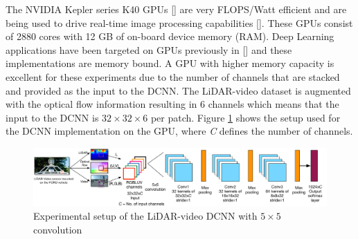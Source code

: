 \documentclass{article}
\begin{document}
The NVIDIA Kepler series K40 GPUs [\cite{NVIDIA-Inc.2012NVIDIAs-Ne}] are very FLOPS/Watt efficient and are being used to drive real-time image processing capabilities [\cite{Venugopal2013Accelerati}]. These GPUs consist of 2880 cores with 12 GB of on-board device memory (RAM). Deep Learning applications have been targeted on GPUs previously in [\cite{Krizhevsky2012Imagenet-C}] and these implementations are memory bound. A GPU with higher memory capacity is excellent for these experiments due to the number of channels that are stacked and provided as the input to the DCNN. The LiDAR-video dataset is augmented with the optical flow information resulting in 6 channels which means that the input to the DCNN is $32\times32\times6$ per patch. Figure \ref{fig:Figures_lidar_dcnn_setup1} shows the setup used for the DCNN implementation on the GPU, where \emph{C} defines the number of channels.

\begin{figure}[htbp]
    \centering
        \includegraphics[scale=0.35]{Figures/lidar_dcnn_setup1.pdf}
    \caption{Experimental setup of the LiDAR-video DCNN with $5\times5$ convolution}
    \label{fig:Figures_lidar_dcnn_setup1}
\end{figure}


\end{document}
